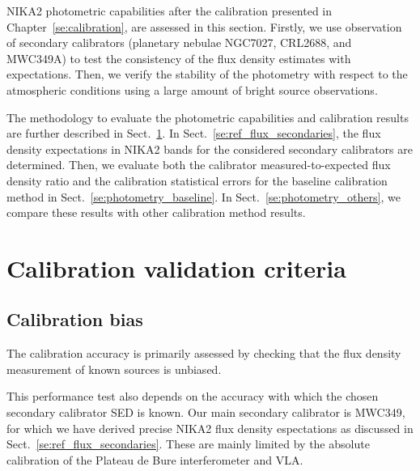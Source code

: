 
NIKA2 photometric capabilities after the calibration presented in
Chapter~\ref{se:calibration}, are assessed in this section. Firstly,
we use observation of secondary calibrators (planetary nebulae NGC7027, CRL2688, and
MWC349A) to test the consistency of the flux density estimates with
expectations. Then, we verify the stability of the photometry with
respect to the atmospheric conditions using a large amount of bright
source observations.


The methodology to evaluate the photometric
capabilities and calibration results are further described in
Sect.~\ref{se:photometry_criteria}.
In Sect.~\ref{se:ref_flux_secondaries}, the flux density expectations
in NIKA2 bands for the considered secondary calibrators are
determined. Then, we evaluate both the calibrator measured-to-expected
flux density ratio and the calibration statistical errors for the
baseline calibration method in Sect.~\ref{se:photometry_baseline}. 
In Sect.~\ref{se:photometry_others}, we compare these results with other
calibration method results. 

\section{Calibration validation criteria}%
\label{se:photometry_criteria}

\subsection{Calibration bias}
The calibration accuracy is primarily assessed by checking
that the flux density measurement of known sources is unbiased.

This performance test also depends on the accuracy with which the
chosen secondary calibrator SED is known. Our main secondary
calibrator is MWC349, for which we have derived precise NIKA2 flux
density espectations as discussed in
Sect.~\ref{se:ref_flux_secondaries}.
These are mainly limited by the absolute calibration of the Plateau de
Bure interferometer and VLA.

